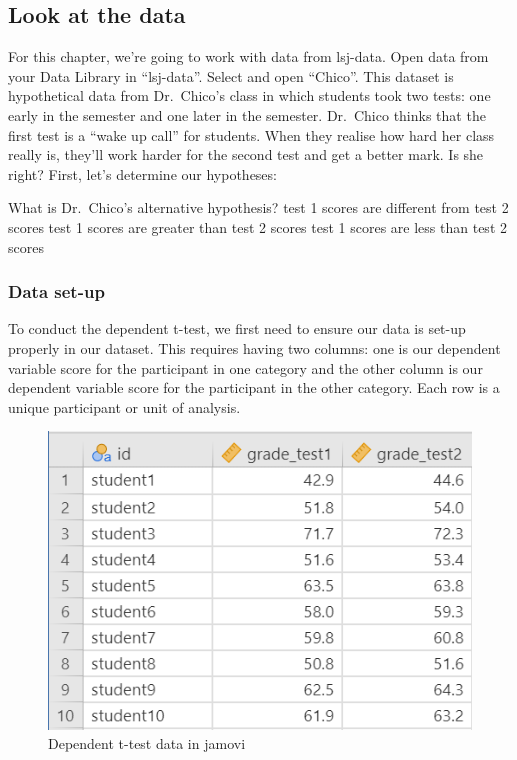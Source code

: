 \documentclass[
]{book}
\begin{document}
\hypertarget{look-at-the-data-2}{%
\subsection{Look at the data}\label{look-at-the-data-2}}

For this chapter, we're going to work with data from lsj-data. Open data from your Data Library in ``lsj-data''. Select and open ``Chico''. This dataset is hypothetical data from Dr.~Chico's class in which students took two tests: one early in the semester and one later in the semester. Dr.~Chico thinks that the first test is a ``wake up call'' for students. When they realise how hard her class really is, they'll work harder for the second test and get a better mark. Is she right? First, let's determine our hypotheses:

What is Dr.~Chico's alternative hypothesis? test 1 scores are different from test 2 scores test 1 scores are greater than test 2 scores test 1 scores are less than test 2 scores

\hypertarget{data-set-up-2}{%
\subsubsection{Data set-up}\label{data-set-up-2}}

To conduct the dependent t-test, we first need to ensure our data is set-up properly in our dataset. This requires having two columns: one is our dependent variable score for the participant in one category and the other column is our dependent variable score for the participant in the other category. Each row is a unique participant or unit of analysis.

\begin{figure}

{\centering \includegraphics[width=0.8\linewidth]{images/03_dependent_t-test/dependent_data} 

}

\caption{Dependent t-test data in jamovi}\label{fig:unnamed-chunk-1}
\end{figure}
\end{document}
